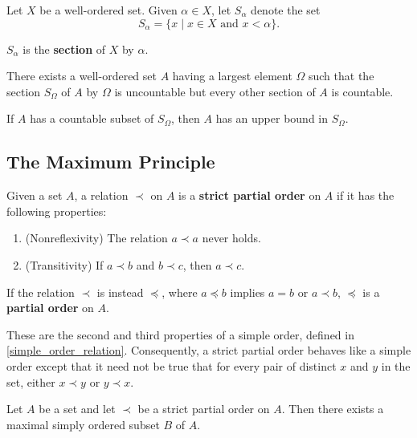 \begin{definition}
Let $X$ be a well-ordered set. Given $\alpha \in X$, let $S_\alpha$ denote the set
\[
    S_\alpha = \{ x \mid x \in X \text{ and } x < \alpha\}.
\]

$S_\alpha$ is the \textbf{section} of $X$ by $\alpha$.
\end{definition}

\begin{lemma}
There exists a well-ordered set $A$ having a largest element $\Omega$ such that the section
$S_\Omega$ of $A$ by $\Omega$ is uncountable but every other section of $A$ is countable.   
\end{lemma}

\begin{theorem}
If $A$ has a countable subset of $S_\Omega$, then $A$ has an upper bound in $S_\Omega$.     
\end{theorem}

\subsection{The Maximum Principle}

\begin{definition}
Given a set $A$, a relation $\prec $ on $A$ is a \textbf{strict partial order} on $A$ if it has the following properties:
\begin{enumerate}
    \item (Nonreflexivity) The relation $a \prec a$ never holds.
    \item (Transitivity) If $a \prec b$ and $b \prec c$, then $a \prec c$.
\end{enumerate}

If the relation $\prec$ is instead $\preceq$, where $a \preceq b$ implies $a = b$ or $a \prec b$, $\preceq$ is a \textbf{partial order} on $A$. 
\end{definition}


\begin{remark}
    These are the second and third properties of a simple order, defined in \cref{simple_order_relation}. 
    Consequently, a strict partial order behaves like a simple order except that it need not be true that for
    every pair of distinct $x$ and $y$ in the set, either $x \prec y$ or $y \prec x$.
\end{remark}

\begin{theorem}
Let $A$ be a set and let $\prec$ be a strict partial order on $A$. Then there exists a maximal simply ordered subset $B$ of $A$.
\end{theorem}


